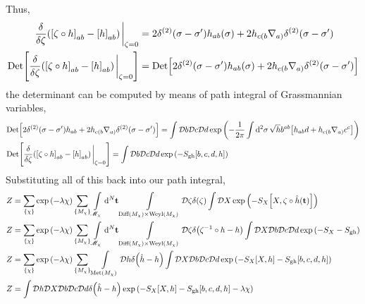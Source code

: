 Thus,
\begin{align*}
    \fdv{}{\zeta}\qty(\qty[\zeta\circ h]_{ab}-\qty[h]_{ab})\eval_{\zeta=0}&=2\delta^{\qty(2)}\qty(\sigma-\sigma')h_{ab}\qty(\sigma)+2h_{c(b}\nabla_{a)}\delta^{\qty(2)}\qty(\sigma-\sigma')\\
    \Det\qty[\fdv{}{\zeta}\qty(\qty[\zeta\circ h]_{ab}-\qty[h]_{ab})\eval_{\zeta=0}]&=\Det\qty[2\delta^{\qty(2)}\qty(\sigma-\sigma')h_{ab}\qty(\sigma)+2h_{c(b}\nabla_{a)}\delta^{\qty(2)}\qty(\sigma-\sigma')]
\end{align*}
the determinant can be computed by means of path integral of Grassmannian variables,
\begin{align*}
    &\Det\qty[2\delta^{\qty(2)}\qty(\sigma-\sigma')h_{ab}+2h_{c(b}\nabla_{a)}\delta^{\qty(2)}\qty(\sigma-\sigma')]=\int\Dd{b}\Dd{c}\Dd{d}\exp\qty(-\frac{1}{2\pi}\int\dd[2]{\sigma}\sqrt{h}b^{ab}\qty[h_{ab}d+h_{c(b}\nabla_{a)}c^c])\\
    &\Det\qty[\fdv{}{\zeta}\qty(\qty[\zeta\circ h]_{ab}-\qty[h]_{ab})\eval_{\zeta=0}]=\int\Dd{b}\Dd{c}\Dd{d}\exp\qty(-S_{\textnormal{gh}}\qty[b,c,d,h])
\end{align*}
Substituting all of this back into our path integral,
\begin{align*}
    Z&=\sum\limits_{\qty{\chi}}\exp\qty(-\lambda \chi)\sum\limits_{\qty{M_\chi}}\int\limits_{\mathscr M_\chi}\dd[N]{\vb t}\int\limits_{\textnormal{Diff}\qty(M_\chi)\times\textnormal{Weyl}\qty(M_\chi)}\mathcal D \zeta\delta\qty(\zeta)\int\mathcal D X\exp\qty(-S_X\qty[X, \zeta\circ\hat h\qty(\vb t)])\\
    Z&=\sum\limits_{\qty{\chi}}\exp\qty(-\lambda \chi)\sum\limits_{\qty{M_\chi}}\int\limits_{\mathscr M_\chi}\dd[N]{\vb t}\int\limits_{\textnormal{Diff}\qty(M_\chi)\times\textnormal{Weyl}\qty(M_\chi)}\mathcal D \zeta\delta\qty(\zeta^{-1}\circ h-h)\int\mathcal D X\mathcal D b\mathcal D c\mathcal D d\exp\qty(-S_X-S_{\textnormal{gh}})\\
    Z&=\sum\limits_{\qty{\chi}}\exp\qty(-\lambda \chi)\sum\limits_{\qty{M_\chi}}\int\limits_{\textnormal{Met}\qty(M_\chi)}\mathcal D h\delta\qty(\hat h-h)\int\mathcal D X\mathcal D b\mathcal D c\mathcal D d\exp\qty(-S_X\qty[X, h]-S_{\textnormal{gh}}\qty[b,c,d,h])\\
    Z&=\int\mathcal D h\mathcal D X\mathcal D b\mathcal D c\mathcal D d\delta\qty(\hat h-h)\exp\qty(-S_X\qty[X, h]-S_{\textnormal{gh}}\qty[b,c,d,h]-\lambda\chi)
\end{align*}
